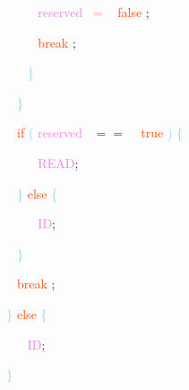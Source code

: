 \documentclass[8, usernames, dvipsnames]{beamer}
\begin{document}
\begin{frame}
 \textcolor{White}{\   }
\textcolor{White}{\   }
\textcolor{White}{\   }
\textcolor{White}{\   }
\textcolor{White}{\   }
\textcolor{Violet}{reserved}\textcolor{White}{\ }
\textcolor{Salmon}{=}
\textcolor{White}{\ }
\textcolor{OrangeRed}{false}
\textcolor{Sepia}{;}

 \textcolor{White}{\   }
\textcolor{White}{\   }
\textcolor{White}{\   }
\textcolor{White}{\   }
\textcolor{White}{\   }
\textcolor{OrangeRed}{break}
\textcolor{Sepia}{;}

 \textcolor{White}{\   }
\textcolor{White}{\   }
\textcolor{White}{\   }
\textcolor{White}{\   }
\textcolor{SkyBlue}{\} }

 \end{frame}
\begin{frame}
\textcolor{White}{\   }
\textcolor{White}{\   }
\textcolor{White}{\   }
\textcolor{SkyBlue}{\} }

 \textcolor{White}{\   }
\textcolor{White}{\   }
\textcolor{White}{\   }
\textcolor{OrangeRed}{if}
\textcolor{SkyBlue}{(}
\textcolor{Violet}{reserved}\textcolor{White}{\ }
\textcolor{OliveGreen}{$==$}
\textcolor{White}{\ }
\textcolor{OrangeRed}{true}
\textcolor{SkyBlue}{)}
\textcolor{SkyBlue}{\{ }

 \textcolor{White}{\   }
\textcolor{White}{\   }
\textcolor{White}{\   }
\textcolor{White}{\   }
\textcolor{OrangeRed}{	}
\textcolor{White}{\ }
\textcolor{Violet}{READ}\textcolor{Sepia}{;}

 \textcolor{White}{\   }
\textcolor{White}{\   }
\textcolor{White}{\   }
\textcolor{SkyBlue}{\} }
\textcolor{OrangeRed}{else}
\textcolor{SkyBlue}{\{ }

 \textcolor{White}{\   }
\textcolor{White}{\   }
\textcolor{White}{\   }
\textcolor{White}{\   }
\textcolor{OrangeRed}{	}
\textcolor{White}{\ }
\textcolor{Violet}{ID}\textcolor{Sepia}{;}

 \textcolor{White}{\   }
\textcolor{White}{\   }
\textcolor{White}{\   }
\textcolor{SkyBlue}{\} }

 \textcolor{White}{\   }
\textcolor{White}{\   }
\textcolor{White}{\   }
\textcolor{OrangeRed}{break}
\textcolor{Sepia}{;}

 \textcolor{White}{\   }
\textcolor{White}{\   }
\textcolor{SkyBlue}{\} }
\textcolor{OrangeRed}{else}
\textcolor{SkyBlue}{\{ }

 \textcolor{White}{\   }
\textcolor{White}{\   }
\textcolor{White}{\   }
\textcolor{OrangeRed}{	}
\textcolor{White}{\ }
\textcolor{Violet}{ID}\textcolor{Sepia}{;}

 \textcolor{White}{\   }
\textcolor{White}{\   }
\textcolor{SkyBlue}{\} }

 \end{frame}
\end{document}
